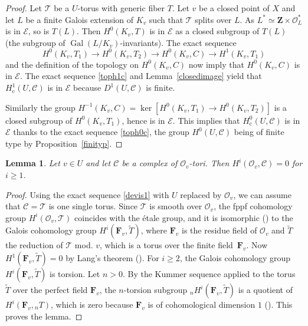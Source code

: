 \documentclass[JEP,XML,SOM,Unicode, NoEqCountersInSection]{cedram}
\let\mathcal\mathscr
\newcommand{\rc}{\mathrm{c}}
\theoremstyle{plain}
\newtheorem{lem}[theo]{Lemma}
\theoremstyle{definition}
\DeclareMathOperator \gal {Gal}
\newcommand \ZZ {\mathbf{Z}}
\newcommand \FF {\mathbf{F}}
\newcommand\cO {\mathcal{O}}
\newcommand \cT {\mathcal{T}}
\newcommand \cC {\mathcal{C}}
\begin{document}
\begin{proof} Let $\cT$ be a
$U$-torus with generic fiber $T$.
Let $v$ be a closed point of $X$ and let $L$ be a finite
Galois extension of $K_v$ such
that $\cT$ splits over $L$. As $L^* \simeq \ZZ \times \cO_L^*$
is in $\mathcal E$, so is $T(L)$.
Then $H^0(K_v,T)$ is in $\mathcal E$
as a closed subgroup of $T(L)$ (the subgroup
of $\gal(L/K_v)$-invariants). The exact sequence
\[
H^0(K_v,T_1) \to H^0(K_v,T_2) \to H^0(K_v,C) \to H^1(K_v,T_1)
\]
and the definition of the topology on $H^0(K_v,C)$ now imply that
$H^0(K_v,C)$ is in $\mathcal E$. The exact sequence \eqref{toph1c}
and Lemma~\ref{closedimage} yield that $H^1_\rc(U,\cC)$ is in $\mathcal E$
because $D^1(U,\cC)$ is finite.

Similarly the group $H^{-1}(K_v,C)=\ker [H^0(K_v,T_1) \to H^0(K_v,T_2)]$ is
a closed subgroup of $H^0(K_v,T_1)$, hence is in $\mathcal E$.
This implies that $H^0_\rc(U,\cC)$ is in $\mathcal E$ thanks to the exact
sequence \eqref{toph0c},
the group $H^0(U,\cC)$ being of finite type by Proposition~\ref{finityp}.
\end{proof}

\begin{lem} \label{vanishlocal}
Let $v \in U$ and let $\cC$ be a complex of $\cO_v$-tori.
Then $H^i(\cO_v, \cC)=0$ for $i \geq 1$.
\end{lem}

\begin{proof} Using the exact sequence \eqref{devis1} with $U$ replaced
by $\cO_v$, we can assume that $\mathcal C=\mathcal T$ is one single
torus. Since $\mathcal T$ is smooth over $\cO_v$, the fppf
cohomology group $H^i(\cO_v, \cT)$ coincides with the étale
group, and it is isomorphic (\cite[Prop.\,II.1.1\,(b)]{MilADT})
to the Galois cohomology group
$H^i(\FF_v,\tilde T)$, where $\FF_v$
is the residue field of $\cO_v$ and $\tilde T$ the reduction of
$\mathcal T$ mod. $v$, which is a torus over the finite field~$\FF_v$. Now $H^1(\FF_v,\tilde T)=0$ by Lang's theorem (\cite{lang}).
For $i \geq 2$, the Galois cohomology group $H^i(\FF_v,\tilde T)$ is torsion.
Let $n >0$. By the Kummer sequence applied to the torus $\tilde T$
over the perfect field $\FF_v$, the $n$-torsion
subgroup $_n H^i(\FF_v,\tilde T)$ is a quotient of $H^i(\FF_v, {}_n T)$, which
is zero because $\FF_v$ is of cohomological dimension $1$ (\cite[Chap.\,XIII, Prop.\,2]{col}). This proves the lemma.
\end{proof}
\end{document}
